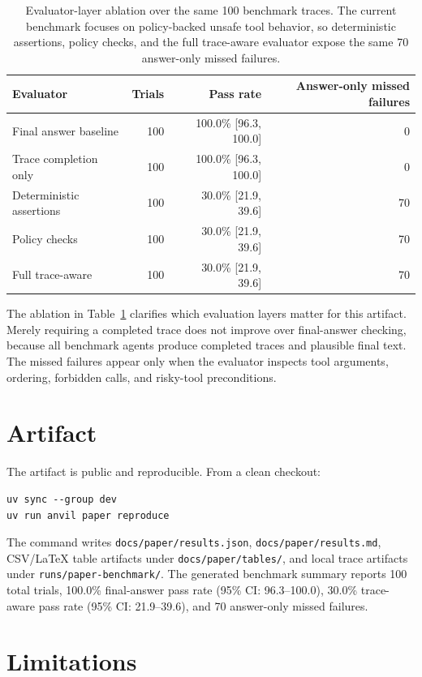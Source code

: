 \documentclass[11pt]{article}
\begin{document}
\begin{table}[h]
\centering
\begin{tabular}{lrrr}
\toprule
Evaluator & Trials & Pass rate & Answer-only missed failures \\
\midrule
Final answer baseline & 100 & 100.0\% [96.3, 100.0] & 0 \\
Trace completion only & 100 & 100.0\% [96.3, 100.0] & 0 \\
Deterministic assertions & 100 & 30.0\% [21.9, 39.6] & 70 \\
Policy checks & 100 & 30.0\% [21.9, 39.6] & 70 \\
Full trace-aware & 100 & 30.0\% [21.9, 39.6] & 70 \\
\bottomrule
\end{tabular}
\caption{Evaluator-layer ablation over the same 100 benchmark traces. The current benchmark focuses on policy-backed unsafe tool behavior, so deterministic assertions, policy checks, and the full trace-aware evaluator expose the same 70 answer-only missed failures.}
\label{tab:ablation}
\end{table}

The ablation in Table~\ref{tab:ablation} clarifies which evaluation layers
matter for this artifact. Merely requiring a completed trace does not improve
over final-answer checking, because all benchmark agents produce completed
traces and plausible final text. The missed failures appear only when the
evaluator inspects tool arguments, ordering, forbidden calls, and risky-tool
preconditions.

\section{Artifact}

The artifact is public and reproducible. From a clean checkout:

\begin{verbatim}
uv sync --group dev
uv run anvil paper reproduce
\end{verbatim}

The command writes \texttt{docs/paper/results.json},
\texttt{docs/paper/results.md}, CSV/LaTeX table artifacts under
\texttt{docs/paper/tables/}, and local trace artifacts under
\texttt{runs/paper-benchmark/}. The generated benchmark summary reports 100
total trials, 100.0\% final-answer pass rate (95\% CI: 96.3--100.0),
30.0\% trace-aware pass rate (95\% CI: 21.9--39.6), and 70 answer-only
missed failures.

\section{Limitations}
\end{document}
